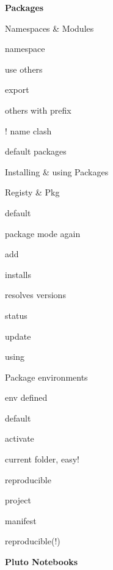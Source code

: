\documentclass[a5paper,12pt,DIV=14,footheight=-30pt, headheight=60pt, twoside=off]{scrartcl}
\newenvironment{sublist}[1][]{%
  \color{juliapurple}%
  \quad\begin{enumerate*}[#1]%
}%
{\end{enumerate*}}
\begin{document}
\textbf{Packages}
\begin{enumerate}[resume]
    \item Namespaces \& Modules
    \begin{sublist}
        \item namespace
        \item use others
        \item export
        \item others with prefix
        \item ! name clash
        \item default packages
    \end{sublist}
    \item Installing \& using Packages
    \begin{sublist}
        \item Registy \& Pkg
        \item default
        \item package mode again
        \item add
        \item installs
        \item resolves versions
        \item status
        \item update
        \item using
    \end{sublist}
    \item Package environments
    \begin{sublist}
        \item env defined
        \item default
        \item activate
        \item current folder, easy!
        \item reproducible
        \item project
        \item manifest
        \item reproducible(!)
    \end{sublist}
\end{enumerate}
\textbf{Pluto Notebooks}
\end{document}
